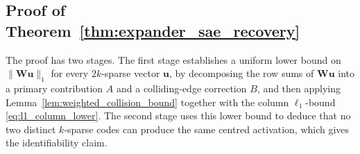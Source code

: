 \documentclass{article}
\theoremstyle{plain}
\theoremstyle{definition}
\theoremstyle{remark}
\begin{document}
\subsection{Proof of Theorem~\ref{thm:expander_sae_recovery}}

The proof has two stages. The first stage establishes a uniform lower bound on $\|\mathbf{W}\mathbf{u}\|_1$ for every $2k$-sparse vector $\mathbf{u}$, by decomposing the row sums of $\mathbf{W}\mathbf{u}$ into a primary contribution $A$ and a colliding-edge correction $B$, and then applying Lemma~\ref{lem:weighted_collision_bound} together with the column $\ell_1$-bound \eqref{eq:l1_column_lower}. The second stage uses this lower bound to deduce that no two distinct $k$-sparse codes can produce the same centred activation, which gives the identifiability claim.
\end{document}

